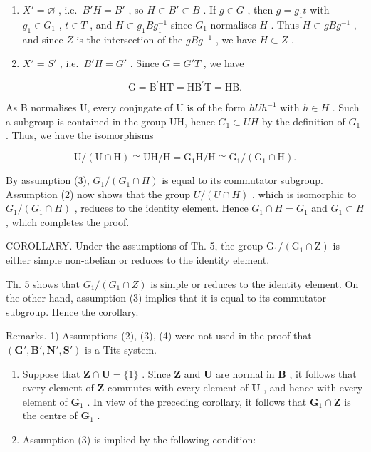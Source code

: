 \begin{enumerate}
\def\labelenumi{\alph{enumi})}
\item
  \(X' = \varnothing\) , i.e.~\(B'H = B'\) , so \(H \subset B' \subset B\) . If \(g \in G\) , then \(g = g_1 t\) with \(g_1 \in G_1\) , \(t \in T\) , and \(H \subset g_1 Bg_1^{-1}\) since \(G_1\) normalises \(H\) . Thus \(H \subset gBg^{-1}\) , and since \(Z\) is the intersection of the \(gBg^{-1}\) , we have \(H \subset Z\) .
\item
  \(X' = S'\) , i.e.~\(B'H = G'\) . Since \(G = G'T\) , we have
\end{enumerate}

\[
\mathrm{G} = \mathrm{B} ^ {\prime} \mathrm{HT} = \mathrm{HB} ^ {\prime} \mathrm{T} = \mathrm{HB}.
\]

As B normalises U, every conjugate of U is of the form \(hUh^{-1}\) with \(h \in H\) . Such a subgroup is contained in the group UH, hence \(G_{1} \subset UH\) by the definition of \(G_{1}\) . Thus, we have the isomorphisms

\[
\mathrm{U} / (\mathrm{U} \cap \mathrm{H}) \cong \mathrm{UH} / \mathrm{H} = \mathrm{G} _ {1} \mathrm{H} / \mathrm{H} \cong \mathrm{G} _ {1} / (\mathrm{G} _ {1} \cap \mathrm{H}).
\]

By assumption (3), \(G_{1}/(G_{1} \cap H)\) is equal to its commutator subgroup. Assumption (2) now shows that the group \(U/(U \cap H)\) , which is isomorphic to \(G_{1}/(G_{1} \cap H)\) , reduces to the identity element. Hence \(G_{1} \cap H = G_{1}\) and \(G_{1} \subset H\) , which completes the proof.

COROLLARY. Under the assumptions of Th. 5, the group \(\mathrm{G}_{1}/(\mathrm{G}_{1} \cap \mathrm{Z})\) is either simple non-abelian or reduces to the identity element.

Th. 5 shows that \(G_{1}/(G_{1} \cap Z)\) is simple or reduces to the identity element. On the other hand, assumption (3) implies that it is equal to its commutator subgroup. Hence the corollary.

Remarks. 1) Assumptions (2), (3), (4) were not used in the proof that \((\mathbf{G}', \mathbf{B}', \mathbf{N}', \mathbf{S}')\) is a Tits system.

\begin{enumerate}
\def\labelenumi{\arabic{enumi})}
\setcounter{enumi}{1}
\item
  Suppose that \(\mathbf{Z} \cap \mathbf{U} = \{1\}\) . Since \(\mathbf{Z}\) and \(\mathbf{U}\) are normal in \(\mathbf{B}\) , it follows that every element of \(\mathbf{Z}\) commutes with every element of \(\mathbf{U}\) , and hence with every element of \(\mathbf{G}_1\) . In view of the preceding corollary, it follows that \(\mathbf{G}_1 \cap \mathbf{Z}\) is the centre of \(\mathbf{G}_1\) .
\item
  Assumption (3) is implied by the following condition:
\end{enumerate}

